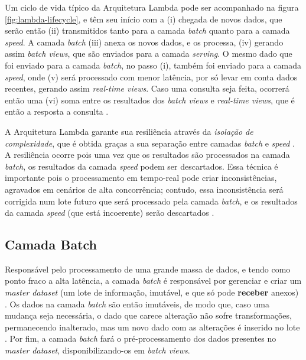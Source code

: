 Um ciclo de vida típico da Arquitetura Lambda pode ser acompanhado na figura
\ref{fig:lambda-lifecycle}, e têm seu início com a (i) chegada
de novos dados, que serão então (ii) transmitidos tanto para a camada
\textit{batch} quanto para a camada \textit{speed}. A camada \textit{batch}
(iii) anexa os novos dados, e os processa, (iv) gerando assim
\textit{batch views}, que são enviados para a camada \textit{serving}. O mesmo
dado que foi enviado para a camada \textit{batch}, no passo (i), também foi
enviado para a camada \textit{speed}, onde (v) será processado com menor latência,
por só levar em conta dados recentes, gerando assim \textit{real-time views}. 
Caso uma consulta seja feita, ocorrerá então uma (vi) soma entre os resultados
dos \textit{batch views} e \textit{real-time views}, que é então a resposta
a consulta \cite{marz2015}.

A Arquitetura Lambda garante sua resiliência através da \textit{isolação de
complexidade}, que é obtida graças a sua separação entre camadas \textit{batch}
e \textit{speed} \cite{marz2015}. A resiliência ocorre pois uma vez que os
resultados são processados na camada \textit{batch}, os resultados da camada
\textit{speed} podem ser descartados. Essa técnica é importante pois o
processamento em tempo-real pode criar inconsistências, agravados em cenários
de alta concorrência; contudo, essa inconsistência será corrigida num lote
futuro que será processado pela camada \textit{batch}, e os resultados
da camada \textit{speed} (que está incoerente) serão descartados \cite{marz2015}.


\subsection{Camada Batch}

Responsável pelo processamento de uma grande massa de dados, e tendo como ponto
fraco a alta latência, a camada \textit{batch} é responsável por gerenciar e
criar um \textit{master dataset} (um lote de informação, imutável, e que só
pode \textbf{receber} anexos) \cite{marz2015}. Os dados na camada \textit{batch}
são então imutáveis, de modo que, caso uma mudança seja necessária, o dado que
carece alteração não sofre transformações, permanecendo inalterado, mas um novo
dado com as alterações é inserido no lote \cite{marz2015}. Por fim, a camada
\textit{batch} fará o pré-processamento dos dados presentes no
\textit{master dataset}, disponibilizando-os em \textit{batch views}.

